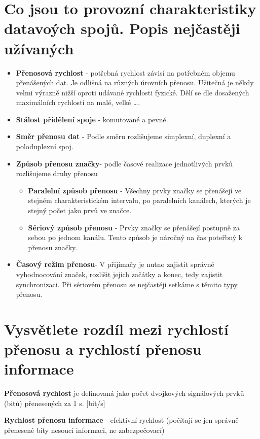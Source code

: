 \section{Co jsou to provozní charakteristiky datavoých spojů. Popis nejčastěji užívaných}
\begin{itemize}
    \item \textbf{Přenosová rychlost} - potřebná rychlost závisí na potřebném objemu přenášených dat.
    Je odlišná na různých úrovních přenosu.
    Užitečná je někdy velmi výrazně nižší oproti udávané rychlosti fyzické.
    Dělí se dle dosažených maximálních rychlostí na malé, velké \dots.
    \item \textbf{Stálost přidělení spoje} - komutované a pevné.
    \item \textbf{Směr přenosu dat} - Podle směru rozlišujeme simplexní, duplexní a poloduplexní spoj.
    \item \textbf{Způsob přenosu značky}- podle časové realizace jednotlivých prvků rozlišujeme druhy přenosu
    \begin{itemize}
        \item \textbf{Paralelní způsob přenosu} - Všechny prvky značky se přenášejí ve stejném charakteristickém intervalu, po paralelních kanálech, kterých je stejný počet jako prvů ve značce.
        \item \textbf{Sériový způsob přenosu} - Prvky značky se přenášejí postupně za sebou po jednom kanálu.
        Tento způsob je náročný na čas poteřbný k přenosu značky.
                
    \end{itemize}
    \item \textbf{ Časový režim přenosu}- V přijímačy je nutno zajistit správné vyhodnocování značek, rozlišit jejich začátky a konec, tedy zajistit synchronizaci.
    Při sériovém přenosu se nejčastěji setkáme s těmito typy přenosu.
\end{itemize}

\section{Vysvětlete rozdíl mezi rychlostí přenosu a rychlostí přenosu informace}
\textbf{Přenosová rychlost} je definovaná jako počet dvojkových signálových prvků (bitů) přenesených za 1 s. [bit/s]

\textbf{Rychlost přenosu informace} - efektivní rychlost (počítají se jen správně přenesené bity nesoucí informaci, ne zabezpečovací)

